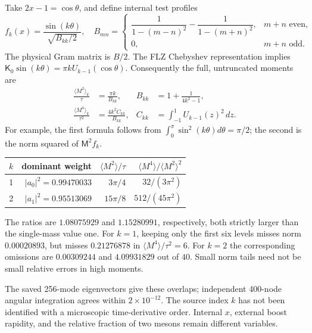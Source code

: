 \documentclass[11pt,a4paper]{article}
\newcommand{\Kop}{\mathsf K}
\begin{document}
Take $2x-1=\cos\theta$, and define internal test profiles
\begin{equation}
 f_k(x)=\frac{\sin(k\theta)}{\sqrt{B_{kk}/2}},\quad
 B_{mn}=\begin{cases}
 \dfrac1{1-(m-n)^2}-\dfrac1{1-(m+n)^2},&m+n\text{ even},\\
 0,&m+n\text{ odd}.
 \end{cases}
\end{equation}
The physical Gram matrix is $B/2$. The FLZ Chebyshev representation
implies $\Kop_0\sin(k\theta)=\pi k U_{k-1}(\cos\theta)$.
Consequently the full, untruncated moments are
\begin{align}
 \frac{\langle M^2\rangle_k}{\tau}&=\frac{\pi k}{B_{kk}},
 &B_{kk}&=1+\frac1{4k^2-1},\\
 \frac{\langle M^4\rangle_k}{\tau^2}&=\frac{4k^2 C_{kk}}{B_{kk}},
 &C_{kk}&=\int_{-1}^1 U_{k-1}(z)^2\,dz.
\end{align}
For example, the first formula follows from
$\int_0^\pi\sin^2(k\theta)d\theta=\pi/2$; the second is the
norm squared of $\mathsf M^2 f_k$.
\begin{center}
\begin{tabular}{crrr}
\toprule
$k$ & dominant weight & $\langle M^2\rangle/\tau$
& $\langle M^4\rangle/\langle M^2\rangle^2$\\
\midrule
1 & $|a_0|^2=0.99470033$ & $3\pi/4$ & $32/(3\pi^2)$\\
2 & $|a_1|^2=0.95513069$ & $15\pi/8$ & $512/(45\pi^2)$\\
\bottomrule
\end{tabular}
\end{center}
The ratios are $1.08075929$ and $1.15280991$, respectively, both
strictly larger than the single-mass value one. For $k=1$, keeping
only the first six levels misses norm $0.00020893$, but misses
$0.21276878$ in $\langle M^4\rangle/\tau^2=6$.
For $k=2$ the corresponding omissions are $0.00309244$ and
$4.09931829$ out of $40$. Small norm tails need not be small
relative errors in high moments.

The saved 256-mode eigenvectors give these overlaps; independent
400-node angular integration agrees within $2\times10^{-12}$.
The source index $k$ has not been identified with a microscopic
time-derivative order. Internal $x$, external boost rapidity, and the
relative fraction of two mesons remain different variables.

\newpage
\end{document}
